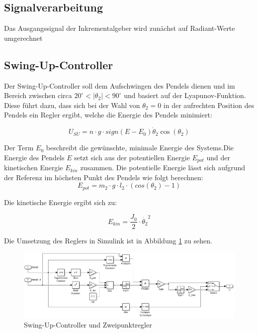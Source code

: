 \subsection{Signalverarbeitung}
\label{signalverarbeitung} 
Das Ausgangssignal der Inkrementalgeber wird zunächst auf Radiant-Werte umgerechnet 

\subsection{Swing-Up-Controller}
\label{Swing-Up-Controller} 

Der Swing-Up-Controller soll dem Aufschwingen des Pendels dienen und im Bereich zwischen circa $20^\circ < \left| \theta_2 \right| < 90^\circ$  und basiert auf der Lyapunov-Funktion. Diese führt dazu, dass sich bei der Wahl von
$ \theta_2 = 0$ in der aufrechten Position des Pendels ein Regler ergibt, welche die Energie des Pendels minimiert:

\begin{equation}
U_{SU} = n \cdot g \cdot sign(E-E_0)\dot{\theta}_2\cos(\theta_2)
\end{equation}

Der Term $E_0$ beschreibt die gewünschte, minimale Energie des Systems.Die Energie des Pendels $E$ setzt sich aus der potentiellen Energie $E_{pot}$ und der kinetischen Energie $E_{kin}$ zusammen. Die potentielle Energie lässt sich aufgrund der Referenz im höchsten Punkt des Pendels wie folgt berechnen:
\begin{equation}
E_{pot} = m_2 \cdot g \cdot l_2 \cdot (cos(\theta_2)-1)
\end{equation}

Die kinetische Energie ergibt sich zu:

\begin{equation}
E_{kin} = \frac{J_0}{2} \cdot \dot{\theta_2}^2
\end{equation}

Die Umsetzung des Reglers in Simulink ist in Abbildung \ref{fig.Simu_Swing-Up} zu sehen. 

\begin{figure}[h!]
  \centering	
	\label{fig.Simu_Swing-Up}
   \includegraphics[width=1\textwidth]{Grafiken/simulink_swingup.png}
      \caption{Swing-Up-Controller und Zweipunktregler}
\end{figure}


